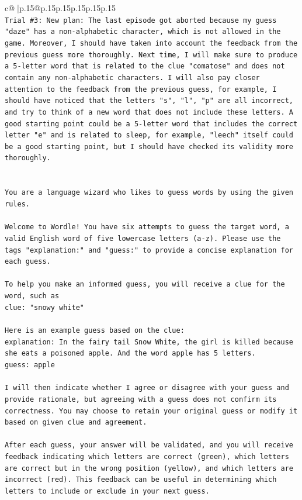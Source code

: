 \documentclass{article}
\begin{document}
{\begin{supertabular}{c@{$\;$}|p{.15\linewidth}@{}p{.15\linewidth}p{.15\linewidth}p{.15\linewidth}p{.15\linewidth}p{.15\linewidth}}
{{{\\ 
\texttt{Trial \#3: New plan: The last episode got aborted because my guess "daze" has a non{-}alphabetic character, which is not allowed in the game. Moreover, I should have taken into account the feedback from the previous guess more thoroughly. Next time, I will make sure to produce a 5{-}letter word that is related to the clue "comatose" and does not contain any non{-}alphabetic characters. I will also pay closer attention to the feedback from the previous guess, for example, I should have noticed that the letters "s", "l", "p" are all incorrect, and try to think of a new word that does not include these letters. A good starting point could be a 5{-}letter word that includes the correct letter "e" and is related to sleep, for example, "leech" itself could be a good starting point, but I should have checked its validity more thoroughly.} \\
\\ 
\\ 
\texttt{You are a language wizard who likes to guess words by using the given rules.} \\
\\ 
\texttt{Welcome to Wordle! You have six attempts to guess the target word, a valid English word of five lowercase letters (a{-}z). Please use the tags "explanation:" and "guess:" to provide a concise explanation for each guess.} \\
\\ 
\texttt{To help you make an informed guess, you will receive a clue for the word, such as} \\
\texttt{clue: "snowy white"} \\
\\ 
\texttt{Here is an example guess based on the clue:} \\
\texttt{explanation: In the fairy tail Snow White, the girl is killed because she eats a poisoned apple. And the word apple has 5 letters.} \\
\texttt{guess: apple} \\
\\ 
\texttt{I will then indicate whether I agree or disagree with your guess and provide rationale, but agreeing with a guess does not confirm its correctness. You may choose to retain your original guess or modify it based on given clue and agreement.} \\
\\ 
\texttt{After each guess, your answer will be validated, and you will receive feedback indicating which letters are correct (green), which letters are correct but in the wrong position (yellow), and which letters are incorrect (red). This feedback can be useful in determining which letters to include or exclude in your next guess.} \\
}}}
\end{supertabular}}
\end{document}
